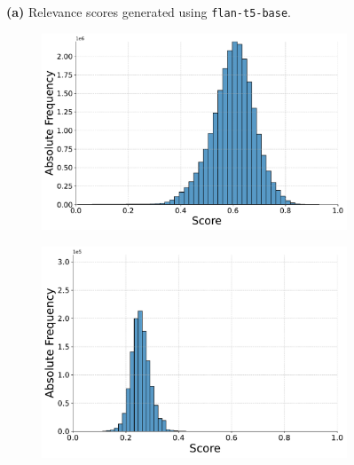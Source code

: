 \begin{figure}[t]
    \vspace{-0.5cm}
    \textbf{(a)} Relevance scores generated using \texttt{flan-t5-base}.
    \vspace{0.5cm}

    \begin{subfigure}[b]{0.49\textwidth}
        \centering
        \includegraphics[width=\textwidth]{graphics/evaluation/pairwise_score_distribution_flan-t5-small.pdf}
        \label{fig:pairwise_flan-t5-small}
    \end{subfigure}
    \hfill
    \begin{subfigure}[b]{0.49\textwidth}
        \centering
        \includegraphics[width=\textwidth]{graphics/evaluation/pointwise_score_distribution_flan-t5-small.pdf}
        \label{fig:pointwise_flan-t5-small}
    \end{subfigure}


\end{figure}
